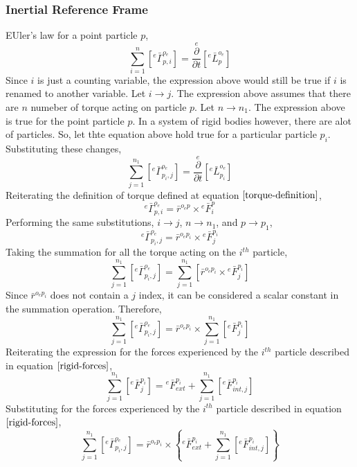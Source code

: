 \documentclass[a4paper, 12pt]{report}
\begin{document}
\begin{center}
\subsubsection{Inertial Reference Frame}
\begin{comment}
\end{comment}
EUler's law for a point particle $p$,
$$\sum^{n}_{i = 1}\left[{}^{e}\bar{\Gamma}^{o_{e}}_{p,i}\right] = \overset{e}{\frac{\partial}{\partial t}}\left[{}^{e}\bar{L}^{o_{e}}_{p}\right]$$
Since $i$ is just a counting variable, the expression above would still be true if $i$ is renamed to another variable. Let $i \to j$. The expression above assumes that there are $n$ numeber of torque acting on particle $p$. Let $n \to n_{1}$. The expression above is true for the point particle $p$. In a system of rigid bodies however, there are alot of particles. So, let thte equation above hold true for a particular particle $p_{i}$. Substituting these changes,
\begin{equation}\sum^{n_{1}}_{j = 1}\left[{}^{e}\bar{\Gamma}^{o_{e}}_{p_{i},j}\right] = \overset{e}{\frac{\partial}{\partial t}}\left[{}^{e}\bar{L}^{o_{e}}_{p_{i}}\right]\label{moments-rigid-1}\end{equation}
Reiterating the definition of torque defined at equation $\ref{torque-definition}$,
$${}^{e}\bar{\Gamma}^{o_{e}}_{p,i} = \bar{r}^{o_{e}p}\times{}^{e}\bar{F}^{p}_{i}$$
Performing the same substitutions, $i \to j$, $n \to n_{1}$, and $p \to p_{1}$,
$${}^{e}\bar{\Gamma}^{o_{e}}_{p_{i},j} = \bar{r}^{o_{e}p_{i}}\times{}^{e}\bar{F}^{p_{i}}_{j}$$
Taking the summation for all the torque acting on the $i^{th}$ particle,
$$\sum^{n_{1}}_{j = 1}\left[{}^{e}\bar{\Gamma}^{o_{e}}_{p_{i},j}\right] = \sum^{n_{1}}_{j = 1}\left[\bar{r}^{o_{e}p_{i}}\times{}^{e}\bar{F}^{p_{i}}_{j}\right]$$
Since $\bar{r}^{o_{e}p_{i}}$ does not contain a $j$ index, it can be considered a scalar constant in the summation operation. Therefore,
$$\sum^{n_{1}}_{j = 1}\left[{}^{e}\bar{\Gamma}^{o_{e}}_{p_{i},j}\right] = \bar{r}^{o_{e}p_{i}}\times\sum^{n_{1}}_{j = 1}\left[{}^{e}\bar{F}^{p_{i}}_{j}\right]$$
Reiterating the expression for the forces experienced by the $i^{th}$ particle described in equation $\ref{rigid-forces}$,
$$\sum^{n_{1}}_{j = 1}\left[{}^{e}\bar{F}^{p_{i}}_{j}\right] = {}^{e}\bar{F}^{p_{i}}_{ext} + \sum^{n_{1}}_{j = 1}\left[{}^{e}\bar{F}^{p_{i}}_{int,j}\right]\label{rigid-forces}$$
Substituting for the forces experienced by the $i^{th}$ particle described in equation $\ref{rigid-forces}$,
$$\sum^{n_{1}}_{j = 1}\left[{}^{e}\bar{\Gamma}^{o_{e}}_{p_{i},j}\right] = \bar{r}^{o_{e}p_{i}}\times\left\{{}^{e}\bar{F}^{p_{i}}_{ext} + \sum^{n_{1}}_{j = 1}\left[{}^{e}\bar{F}^{p_{i}}_{int,j}\right]\right\}$$

\end{center}
\end{document}
